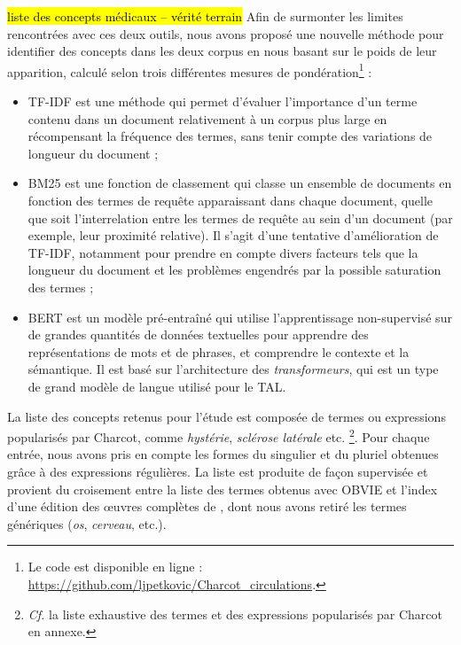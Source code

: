 \hl{liste des concepts médicaux -- vérité terrain}
Afin de surmonter les limites rencontrées avec ces deux outils, nous avons proposé une nouvelle méthode pour identifier des concepts dans les deux corpus en nous basant sur le poids de leur apparition, calculé selon trois différentes mesures de pondération\footnote{Le code est disponible en ligne : \url{https://github.com/ljpetkovic/Charcot\_circulations}.} :
\begin{itemize}
\item \textsc{TF-IDF} est une méthode qui permet d'évaluer l'importance d'un terme contenu dans un document relativement à un corpus plus large en récompensant la fréquence des termes, sans tenir compte des variations de longueur du document ;
\item \textsc{BM25} est une fonction de classement qui classe un ensemble de documents en fonction des termes de requête apparaissant dans chaque document, quelle que soit l'interrelation entre les termes de requête au sein d'un document (par exemple, leur proximité relative). Il s'agit d'une tentative d'amélioration de \textsc{TF-IDF}, notamment pour prendre en compte divers facteurs tels que la longueur du document et les problèmes engendrés par la possible saturation des termes \citep[p.~355]{robertson2009probabilistic} ;
\item \textsc{BERT} \citep{devlin2019} est un modèle pré-entraîné qui utilise l'apprentissage non-supervisé sur de grandes quantités de données textuelles pour apprendre des représentations de mots et de phrases, et comprendre le contexte et la sémantique. Il est basé sur l'architecture des \textit{transformeurs}, qui est un type de grand modèle de langue utilisé pour le \textsc{TAL}.
\end{itemize}

La liste des concepts retenus pour l'étude est composée de termes ou expressions popularisés par Charcot, comme \textit{hystérie}, \textit{sclérose latérale} etc. \citep[p.~1102]{camargo2023} \footnote{\textit{Cf.} la liste exhaustive des termes et des expressions popularisés par Charcot en annexe.}. Pour chaque entrée, nous avons pris en compte les formes du singulier et du pluriel obtenues grâce à des expressions régulières. La liste est  produite de façon supervisée et provient du croisement entre la liste des termes obtenus avec OBVIE et l'index d'une édition des \oe{}uvres complètes de \cite[pp.~493--507]{charcot1892oeuvres}, dont nous avons retiré les termes génériques (\textit{os}, \textit{cerveau}, etc.).


